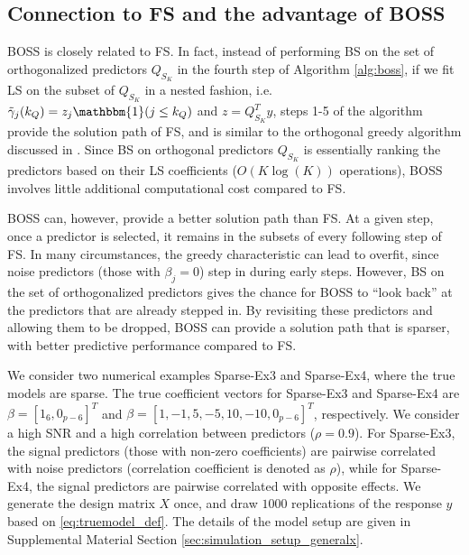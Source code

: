 \subsection{Connection to FS and the advantage of BOSS}

BOSS is closely related to FS. In fact, instead of performing BS on the set of orthogonalized predictors $Q_{S_{K}}$ in the fourth step of Algorithm \ref{alg:boss}, if we fit LS on the subset of $Q_{S_{K}}$ in a nested fashion, i.e. $\tilde{\gamma}_j (k_Q)= z_j \mathbbm{1}(j \le k_Q)$ and $z=Q_{S_{K}}^T y$, steps 1-5 of the algorithm provide the solution path of FS, and is similar to the orthogonal greedy algorithm discussed in \citet{ing2011stepwise}. Since BS on orthogonal predictors $Q_{S_K}$ is essentially ranking the predictors based on their LS coefficients ($O(K\log(K))$ operations), BOSS involves little additional computational cost compared to FS.

BOSS can, however, provide a better solution path than FS. At a given step, once a predictor is selected, it remains in the subsets of every following step of FS. In many circumstances, the greedy characteristic can lead to overfit, since noise predictors (those with $\beta_j=0$) step in during early steps. However, BS on the set of orthogonalized predictors gives the chance for BOSS to ``look back'' at the predictors that are already stepped in. By revisiting these predictors and allowing them to be dropped, BOSS can provide a solution path that is sparser, with better predictive performance compared to FS. 

We consider two numerical examples Sparse-Ex3 and Sparse-Ex4, where the true models are sparse. The true coefficient vectors for Sparse-Ex3 and Sparse-Ex4 are $\beta=[1_6,0_{p-6}]^T$ and $\beta=[1,-1,5,-5,10,-10,0_{p-6}]^T$, respectively. We consider a high SNR and a high correlation between predictors ($\rho=0.9$). For Sparse-Ex3, the signal predictors (those with non-zero coefficients) are pairwise correlated with noise predictors (correlation coefficient is denoted as $\rho$), while for Sparse-Ex4, the signal predictors are pairwise correlated with opposite effects. We generate the design matrix $X$ once, and draw $1000$ replications of the response $y$ based on \eqref{eq:truemodel_def}. The details of the model setup are given in Supplemental Material Section \ref{sec:simulation_setup_generalx}.


